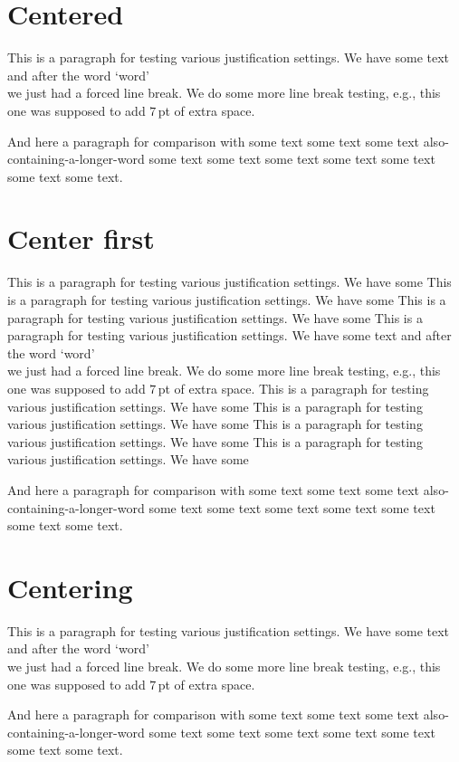 \documentclass{article}
\begin{document}
\section{Centered}

This is a paragraph for testing various justification settings. We have some
text and after the word `word' \\ we just had a forced line break. We
do some more line break testing, e.g., this\\[7pt] one was supposed to
add $7$\,pt of extra space.

And here a paragraph for comparison with some text some text some text
also-containing-a-longer-word some text some text some text some text
some text some text some text.

\section{Center first}

This is a paragraph for testing various justification settings. We have some
This is a paragraph for testing various justification settings. We have some
This is a paragraph for testing various justification settings. We have some
This is a paragraph for testing various justification settings. We have some
text and after the word `word' \\ we just had a forced line break. We
do some more line break testing, e.g., this\\[7pt] one was supposed to
add $7$\,pt of extra space.
This is a paragraph for testing various justification settings. We have some
This is a paragraph for testing various justification settings. We have some
This is a paragraph for testing various justification settings. We have some
This is a paragraph for testing various justification settings. We have some

And here a paragraph for comparison with some text some text some text
also-containing-a-longer-word some text some text some text some text
some text some text some text.

\section{Centering}

This is a paragraph for testing various justification settings. We have some
text and after the word `word' \\ we just had a forced line break. We
do some more line break testing, e.g., this\\[7pt] one was supposed to
add $7$\,pt of extra space.

And here a paragraph for comparison with some text some text some text
also-containing-a-longer-word some text some text some text some text
some text some text some text.
\end{document}
